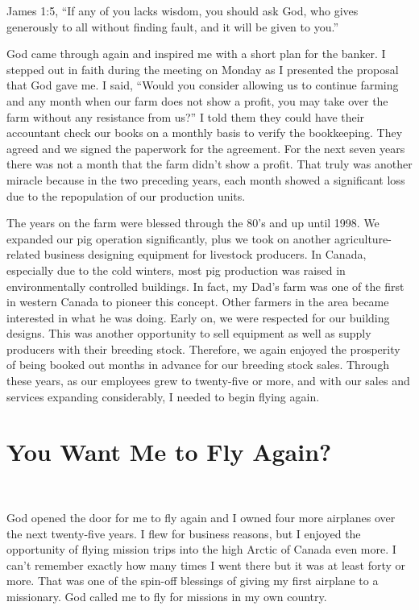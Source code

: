 \documentclass[oneside]{book}
\begin{document}
James 1:5, “If any of you lacks wisdom, you should ask God, who gives generously to all without finding fault, and it will be given to you.” 

God came through again and inspired me with a short plan for the banker. I stepped out in faith during the meeting on Monday as I presented the proposal that God gave me. I said, “Would you consider allowing us to continue farming and any month when our farm does not show a profit, you may take over the farm without any resistance from us?” I told them they could have their accountant check our books on a monthly basis to verify the bookkeeping. They agreed and we signed the paperwork for the agreement. For the next seven years there was not a month that the farm didn't show a profit. That truly was another miracle because in the two preceding years, each month showed a significant loss due to the repopulation of our production units.

The years on the farm were blessed through the 80's and up until 1998. We expanded our pig operation significantly, plus we took on another agriculture-related business designing equipment for livestock producers. In Canada, especially due to the cold winters, most pig production was raised in environmentally controlled buildings. In fact, my Dad's farm was one of the first in western Canada to pioneer this concept. Other farmers in the area became interested in what he was doing. Early on, we were respected for our building designs. This was another opportunity to sell equipment as well as supply producers with their breeding stock. Therefore, we again enjoyed the prosperity of being booked out months in advance for our breeding stock sales. Through these years, as our employees grew to twenty-five or more, and with our sales and services expanding considerably, I needed to begin flying again.


\section{You Want Me to Fly Again?}
\

God opened the door for me to fly again and I owned four more airplanes over the next twenty-five years. I flew for business reasons, but I enjoyed the opportunity of flying mission trips into the high Arctic of Canada even more. I can't remember exactly how many times I went there but it was at least forty or more. That was one of the spin-off blessings of giving my first airplane to a missionary. God called me to fly for missions in my own country. 
\end{document}
